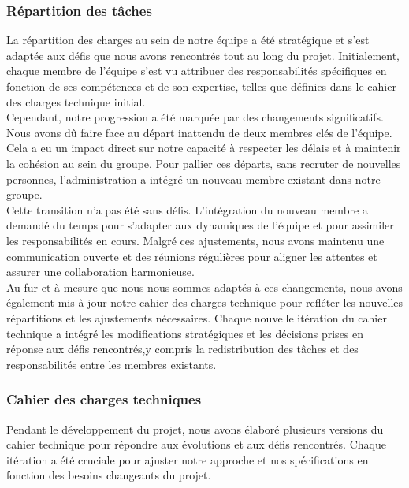 \subsubsection{Répartition des tâches }


La répartition des charges au sein de notre équipe a été stratégique et s'est adaptée aux défis que nous avons rencontrés tout au long du projet.
Initialement, chaque membre de l'équipe s'est vu attribuer des responsabilités spécifiques en fonction de ses compétences et de son expertise, telles que définies dans le cahier des charges technique initial.
\\

Cependant, notre progression a été marquée par des changements significatifs.
Nous avons dû faire face au départ inattendu de deux membres clés de l'équipe.
Cela a eu un impact direct sur notre capacité à respecter les délais et à maintenir la cohésion au sein du groupe. Pour pallier ces départs, sans recruter de nouvelles personnes, l'administration a intégré un nouveau membre existant dans notre groupe.
\\

Cette transition n'a pas été sans défis.
L'intégration du nouveau membre a demandé du temps pour s'adapter aux dynamiques de l'équipe et pour assimiler les responsabilités en cours.
Malgré ces ajustements, nous avons maintenu une communication ouverte et des réunions régulières pour aligner les attentes et assurer une collaboration harmonieuse.
\\

Au fur et à mesure que nous nous sommes adaptés à ces changements,
nous avons également mis à jour notre cahier des charges technique pour refléter les nouvelles répartitions et les ajustements nécessaires.
Chaque nouvelle itération du cahier technique a intégré les modifications stratégiques et les décisions prises en réponse aux défis rencontrés,y compris la redistribution des tâches et des responsabilités entre les membres existants.
\\

\subsubsection{Cahier des charges techniques}
Pendant le développement du projet, nous avons élaboré plusieurs versions du cahier technique pour répondre aux évolutions et aux défis rencontrés.
Chaque itération a été cruciale pour ajuster notre approche et nos spécifications en fonction des besoins changeants du projet.
\\

